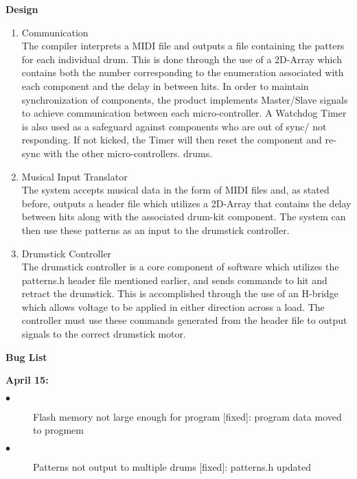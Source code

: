 \documentclass[]{report}
\begin{document}
\begin{center} \textbf{Design} \end{center}
\begin{enumerate}
	\item Communication\\The compiler interprets a MIDI file and outputs a file containing the patters for each individual drum. This is done through the use of a 2D-Array which contains both the number corresponding to the enumeration associated with each component and the delay in between hits. In order to maintain synchronization of components, the product implements Master/Slave signals to achieve communication between each micro-controller. A Watchdog Timer is also used as a safeguard against components who are out of sync/ not responding. If not kicked, the Timer will then reset the component and re-sync with the other micro-controllers. %
	drums.
	\item Musical Input Translator\\ The system accepts musical data in the form of MIDI files and, as stated before, outputs a header file which utilizes a 2D-Array that contains the delay between hits along with the associated drum-kit component. The system can then use these patterns as an input to the drumstick controller. 
	\item Drumstick	Controller\\
	The	drumstick	controller is a core component of software which utilizes the patterns.h header file mentioned earlier, and sends commands to	hit	and	retract	the	drumstick. This is accomplished through the use of an H-bridge which allows voltage to be applied in either direction across a load. The controller must use these commands generated from the header file to output signals to the correct drumstick motor.
\end{enumerate}
\begin{center} \textbf{Bug List}\\\vspace{5mm} \end{center}
\indent \textbf{April 15:}
\begin{description}
\item[$\bullet$] Flash memory not large enough for program [fixed]: program data moved to progmem\\
\item[$\bullet$] Patterns not output to multiple drums [fixed]: patterns.h updated
\end{description}
\end{document}
